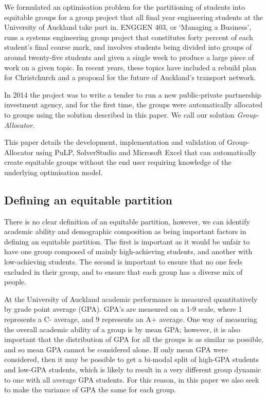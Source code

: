 \documentclass[12pt]{ORSNZ}
\begin{document}
We formulated an optimisation problem for the partitioning of students into equitable groups for a group project that all final year engineering students at the University of Auckland take part in. ENGGEN 403, or `Managing a Business', runs a systems engineering group project that constitutes forty percent of each student's final course mark, and involves students being divided into groups of around twenty-five students and given a single week to produce a large piece of work on a given topic. In recent years, these topics have included a rebuild plan for Christchurch and a proposal for the future of Auckland's transport network.

In 2014 the project was to write a tender to run a new public-private partnership investment agency, and for the first time, the groups were automatically allocated to groups using the solution described in this paper. We call our solution \emph{Group-Allocator}.

This paper details the development, implementation and validation of Group-Allocator using PuLP, SolverStudio and Microsoft Excel that can automatically create equitable groups without the end user requiring knowledge of the underlying optimisation model.

\subsection{Defining an equitable partition}
There is no clear definition of an equitable partition, however, we can identify academic ability and demographic composition as being important factors in defining an equitable partition. The first is important as it would be unfair to have one group composed of mainly high-achieving students, and another with low-achieving students. The second is important to ensure that no one feels excluded in their group, and to ensure that each group has a diverse mix of people.

At the University of Auckland academic performance is measured quantitatively by grade point average (GPA). GPA's are measured on a 1-9 scale, where 1 represents a C- average, and 9 represents an A+ average. One way of measuring the overall academic ability of a group is by mean GPA; however, it is also important that the distribution of GPA for all the groups is as similar as possible, and so mean GPA cannot be considered alone. If only mean GPA were considered, then it may be possible to get a bi-modal split of high-GPA students and low-GPA students, which is likely to result in a very different group dynamic to one with all average GPA students. For this reason, in this paper we also seek to make the variance of GPA the same for each group. 
\end{document}
